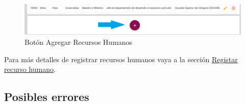             \begin{figure}[H]
                \centering
                \hypertarget{add}{\includegraphics[width=0.7\linewidth]{images/SP1/BtnAgregar}}
                \caption{Botón Agregar Recursos Humanos}
                \label{add}
            \end{figure}

            Para más detalles de registrar recursos humanos vaya a la sección \hyperlink{registrar}{Registar recurso humano}.

        \subsection{Posibles errores}
